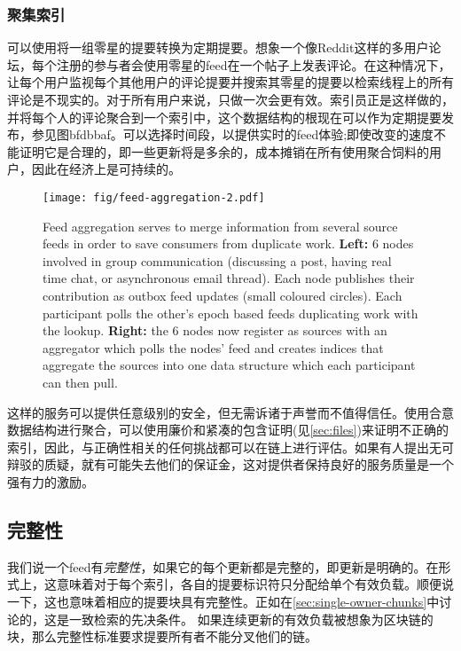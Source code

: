 \subsubsection{聚集索引}

可以使用将一组零星的提要转换为定期提要。想象一个像Reddit这样的多用户论坛，每个注册的参与者会使用零星的feed在一个帖子上发表评论。在这种情况下，让每个用户监视每个其他用户的评论提要并搜索其零星的提要以检索线程上的所有评论是不现实的。对于所有用户来说，只做一次会更有效。索引员正是这样做的，并将每个人的评论聚合到一个索引中，这个数据结构的根现在可以作为定期提要发布，参见图bfdbbaf。可以选择时间段，以提供实时的feed体验;即使改变的速度不能证明它是合理的，即一些更新将是多余的，成本摊销在所有使用聚合饲料的用户，因此在经济上是可持续的。 

\begin{figure}[htbp]
\centering
\texttt{[image: fig/feed-aggregation-2.pdf]}
\caption[Feed aggregation \statusyellow]{Feed aggregation serves to merge information from several source feeds in order to save consumers from duplicate work. \textbf{Left:} 6 nodes involved in group communication (discussing a post, having real time chat, or asynchronous email thread). Each node publishes their contribution as outbox feed updates (small coloured circles). Each participant polls the other's epoch based feeds duplicating work with the lookup. \textbf{Right:} the 6 nodes now register  as sources  with an aggregator which polls the nodes' feed and creates indices that aggregate the sources into one data structure which each participant can then pull.}
\label{fig:feed-aggregation}
\end{figure}

这样的服务可以提供任意级别的安全，但无需诉诸于声誉而不值得信任。使用合意数据结构进行聚合，可以使用廉价和紧凑的包含证明(见\ref{sec:files})来证明不正确的索引，因此，与正确性相关的任何挑战都可以在链上进行评估。如果有人提出无可辩驳的质疑，就有可能失去他们的保证金，这对提供者保持良好的服务质量是一个强有力的激励。

\subsection{完整性\statusyellow}\label{sec:feed-integrity}

我们说一个feed有\emph{完整性}，如果它的每个更新都是完整的，即更新是明确的。在形式上，这意味着对于每个索引，各自的提要标识符只分配给单个有效负载。顺便说一下，这也意味着相应的提要块具有完整性。正如在\ref{sec:single-owner-chunks}中讨论的，这是一致检索的先决条件。 
如果连续更新的有效负载被想象为区块链的块，那么完整性标准要求提要所有者不能分叉他们的链。 

